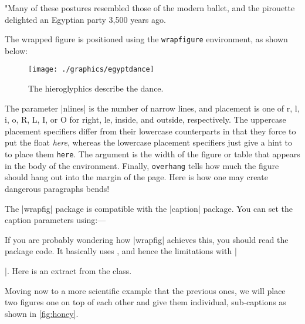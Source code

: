 "Many of these postures resembled those of the modern ballet, and the pirouette delighted an Egyptian party 3,500 years ago.
\medskip

The wrapped figure is positioned using the \texttt{wrapfigure} environment, as shown below:

\begin{teX}
\begin{wrapfigure}[nlines]{placement}[overhang ]{width }
   \texttt{[image: ./graphics/egyptdance]} 
   \caption{\small The hieroglyphics describe the dance.}
\end{wrapfigure}
\end{teX}

The parameter |nlines|  is the number of narrow lines, and placement is one of r, l, i, o, R, L, I, or
O for right, le, inside, and outside, respectively. The uppercase placement specifiers
differ from their lowercase counterparts in that they force \latex to put the float \emph{here},
whereas the lowercase placement specifiers just give a hint to \latex to place them
\texttt{here}. The  argument is the width of the figure or table that appears in the body
of the environment. Finally, \texttt{overhang} tells \latex how much the figure should hang out
into the margin of the page. Here is how one may create dangerous paragraphs bends!

The |wrapfig| package is compatible with the |caption| package. You can set the caption parameters using:---

\begin{teX}
\captionsetup[wrapfigure]{<options>}
\end{teX}

If you are probably wondering how |wrapfig| achieves this, you should read the package code. It basically uses , and hence the limitations with |\par|. Here is an extract from the class.

\begin{teX}

\def\WF@startfloating{%
 \WF@everypar\expandafter{\the\everypar}\let\everypar\WF@everypar
 \WF@@everypar{\ifvoid\WF@box\else\WF@floathand\fi \the\everypar
 \WF@wraphand
}}
\end{teX}

Moving now to a more scientific example that the previous ones, we will place two figures
one on top of each other and give them individual, sub-captions as shown in \ref{fig:honey}.
 
